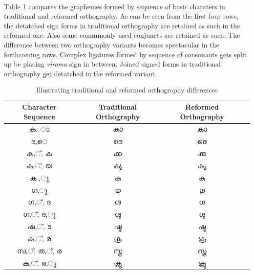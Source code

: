 \documentclass[10pt]{article}
\begin{document}
\paragraph{}
Table \ref{orthographycomparison} compares the graphemes formed by sequence of basic charaters in traditional and reformed orthography. As can be seen from the first four rows, the detatched sign forms in traditional orthography are retained as such in the reformed one. Also some commmonly used conjuncts are retained as such. The difference between two orthography variants becomes spectacular in the forthcoming rows. Complex ligatures formed by sequence of consonants gets split up be placing \textit{virama} sign in between. Joined signed forms in traditional orthography get detatched in the reformed variant.

\begin{table}
	\centering

\begin{tabular}{|c|c|c|c}
	\hline
	Character Sequence & Traditional Orthography & Reformed Orthography \\ \hline
		{\manjari ക, ാ} & {\manjari കാ} & {\raghu കാ} \\
	\hline
		{\manjari ദ,െ} & {\manjari ദെ} & {\raghu ദെ}  \\
	\hline
		{\manjari ക,്, ക} & {\manjari ക്ക} & {\raghu ക്ക} \\
	\hline
		{\manjari ക,്, യ} & {\manjari ക്യ} & {\raghu ക്യ} \\
	\hline
		{\manjari ക ,ു} & {\manjari കു} & {\raghu കു} \\
	\hline
		{\manjari ഗ,ു} & {\manjari ഗു} & {\raghu ഗു} \\
	\hline
		{\manjari ഗ,്, ദ} & {\manjari ഗ്ദ} & {\raghu ഗ്ദ} \\
	\hline
		{\manjari ഗ,്, ദ,ു} & {\manjari ഗ്ദു} & {\raghu ഗ്ദു} \\
	\hline
		{\manjari ഷ,്, ട} & {\manjari ഷ്ട} & {\raghu ഷ്ട} \\	
	\hline
		{\manjari ക,്, ര} & {\manjari ക്ര} & {\raghu ക്ര} \\
	\hline
		{\manjari സ,്, ത,്, ര} & {\manjari സ്ത്ര} & {\raghu സ്ത്ര} \\
	\hline
		{\manjari ക,്, ര,ു} & {\manjari ക്രു} & {\raghu ക്രു} \\
	\hline

\end{tabular}
\caption{Illustrating traditional and reformed orthography differences}
\label{orthographycomparison}
\end{table}
\end{document}
